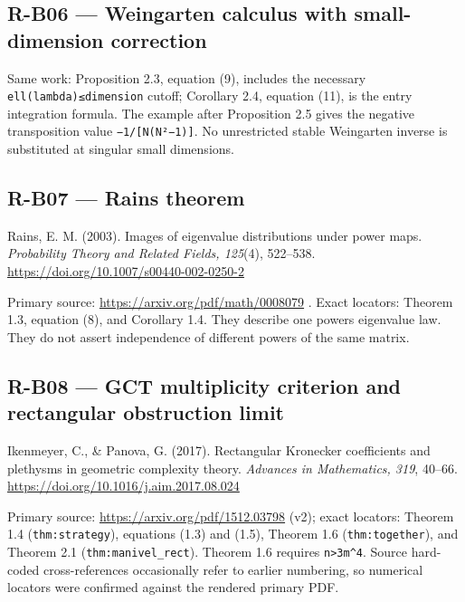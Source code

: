 \documentclass[11pt,a4paper]{article}
\theoremstyle{definition}\newtheorem{definition}{Definition}
\begin{document}
\subsection{R-B06 --- Weingarten calculus with small-dimension
correction}\label{r-b06--weingarten-calculus-with-small-dimension-correction}

Same work: Proposition 2.3, equation (9), includes the necessary
\texttt{ell(lambda)≤dimension} cutoff; Corollary 2.4, equation (11), is
the entry integration formula. The example after Proposition 2.5 gives
the negative transposition value \texttt{−1/{[}N(N²−1){]}}. No
unrestricted stable Weingarten inverse is substituted at singular small
dimensions.

\subsection{R-B07 --- Rains theorem}\label{r-b07--rains-theorem}

Rains, E. M. (2003). Images of eigenvalue distributions under power
maps. \emph{Probability Theory and Related Fields, 125}(4), 522--538.
\url{https://doi.org/10.1007/s00440-002-0250-2}

Primary source: \url{https://arxiv.org/pdf/math/0008079} . Exact
locators: Theorem 1.3, equation (8), and Corollary 1.4. They describe
one power\textquotesingle s eigenvalue law. They do not assert
independence of different powers of the same matrix.

\subsection{R-B08 --- GCT multiplicity criterion and rectangular
obstruction
limit}\label{r-b08--gct-multiplicity-criterion-and-rectangular-obstruction-limit}

Ikenmeyer, C., \& Panova, G. (2017). Rectangular Kronecker coefficients
and plethysms in geometric complexity theory. \emph{Advances in
Mathematics, 319}, 40--66.
\url{https://doi.org/10.1016/j.aim.2017.08.024}

Primary source: \url{https://arxiv.org/pdf/1512.03798} (v2); exact
locators: Theorem 1.4 (\texttt{thm:strategy}), equations (1.3) and
(1.5), Theorem 1.6 (\texttt{thm:together}), and Theorem 2.1
(\texttt{thm:manivel\_rect}). Theorem 1.6 requires
\texttt{n\textgreater{}3m\^{}4}. Source hard-coded cross-references
occasionally refer to earlier numbering, so numerical locators were
confirmed against the rendered primary PDF.
\end{document}
